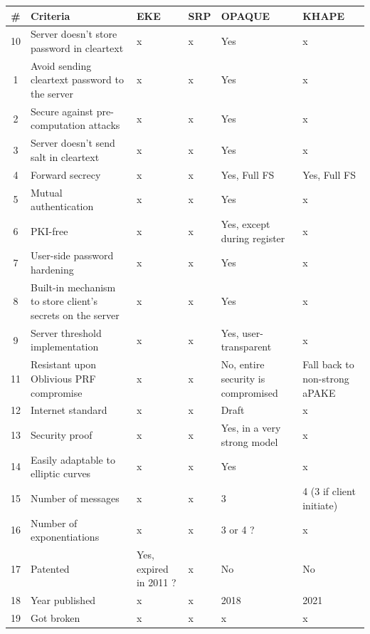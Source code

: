 \documentclass[../report.tex]{subfiles}
\begin{document}
\begin{center}
   \begin{tabular}{ | c | p{8cm} || p{1cm} | p{1cm} | p{2cm} | p{2cm} | }
     \hline
     \textbf{\#} & \textbf{Criteria} & \textbf{EKE} & \textbf{SRP} & \textbf{OPAQUE} & \textbf{KHAPE} \\ \hline
     
     
     
     10 & Server doesn't store password in cleartext & x & x & Yes & x \\ \hline
     1 & Avoid sending cleartext password to the server & x & x & Yes & x \\ \hline
     2 & Secure against pre-computation attacks & x & x & Yes & x \\ \hline
     3 & Server doesn't send salt in cleartext & x & x & Yes & x \\ \hline
     4 & Forward secrecy & x & x & Yes, Full FS & Yes, Full FS \\ \hline
     5 & Mutual authentication & x & x & Yes & x \\ \hline
     6 & PKI-free & x & x & Yes, except during register & x \\ \hline
     7 & User-side password hardening & x & x & Yes & x \\ \hline
     8 & Built-in mechanism to store client's secrets on the server & x & x & Yes & x \\ \hline
     9 & Server threshold implementation & x & x & Yes, user-transparent & x \\ \hline
     11 & Resistant upon Oblivious PRF compromise & x & x & No, entire security is compromised & Fall back to non-strong aPAKE \\ \hline
     12 & Internet standard & x & x & Draft & x \\ \hline
     13 & Security proof & x & x & Yes, in a very strong model & x \\ \hline
     
     
     14 & Easily adaptable to elliptic curves & x & x & Yes & x \\ \hline
     15 & Number of messages & x & x & 3 & 4 (3 if client initiate) \\ \hline
     16 & Number of exponentiations & x & x & 3 or 4 ? & x \\ \hline
     17 & Patented & Yes, expired in 2011 ? & x & No & No \\ \hline
     18 & Year published & x & x & 2018 & 2021 \\ \hline
     19 & Got broken & x & x & x & x \\ \hline

     \end{tabular}
 \end{center}
 
\end{document}
